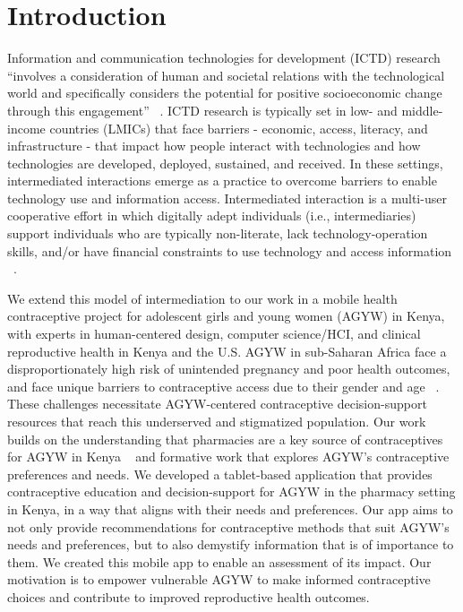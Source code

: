 \section{Introduction}

Information and communication technologies for development (ICTD) research ``involves a consideration of human and societal relations with the technological world and specifically considers the potential for positive socioeconomic change through this engagement” ~\cite{burrell2009constitutes}. ICTD research is typically set in low- and middle-income countries (LMICs) that face barriers - economic, access, literacy, and infrastructure - that impact how people interact with technologies and how technologies are developed, deployed, sustained, and received. In these settings, intermediated interactions emerge as a practice to overcome barriers to enable technology use and information access. Intermediated interaction is a multi-user cooperative effort in which digitally adept individuals (i.e., intermediaries) support individuals who are typically non-literate, lack technology-operation skills, and/or have financial constraints to use technology and access information ~\cite{10.1145/1753326.1753718, 1626204}.

We extend this model of intermediation to our work in a mobile health contraceptive project for adolescent girls and young women (AGYW) in Kenya, with experts in human-centered design, computer science/HCI, and clinical reproductive health in Kenya and the U.S. AGYW in sub-Saharan Africa face a disproportionately high risk of unintended pregnancy and poor health outcomes, and face unique barriers to contraceptive access due to their gender and age ~\cite{sully2020adding}. These challenges necessitate AGYW-centered contraceptive decision-support resources that reach this underserved and stigmatized population. Our work builds on the understanding that pharmacies are a key source of contraceptives for AGYW in Kenya ~\cite{gonsalves2023pharmacies, gonsalves2020mixed, radovich2018meets} and formative work that explores AGYW’s contraceptive preferences and needs. We developed a tablet-based application  that provides contraceptive education and decision-support for AGYW in the pharmacy setting in Kenya, in a way that aligns with their needs and preferences. Our app aims to not only provide recommendations for contraceptive methods that suit AGYW’s needs and preferences, but to also demystify information that is of importance to them. We created this mobile app to enable an assessment of its impact. Our motivation is to empower vulnerable AGYW to make informed contraceptive choices and contribute to improved reproductive health outcomes. 

